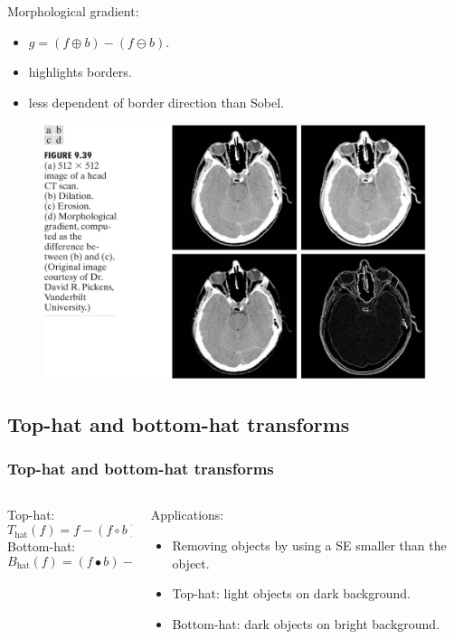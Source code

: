 \begin{frame}
Morphological gradient:
\begin{itemize}
\item $g = (f\oplus b) - (f \ominus b)$.
\item highlights borders.
\item less dependent of border direction than Sobel.
\end{itemize}
\begin{figure}[!h]
\includegraphics[width=.6\textwidth]{fig-9-39.png}
\end{figure}
\end{frame}

\subsection{Top-hat and bottom-hat transforms}

\begin{frame}
\frametitle{Top-hat and bottom-hat transforms}
\begin{columns}
\begin{column}{.5\textwidth}
Top-hat:
\[
T_{\text{hat}} (f) = f - (f \circ b)
\]
Bottom-hat:
\[
B_{\text{hat}} (f) = (f \bullet b) - f
\]
\end{column}
\begin{column}{.5\textwidth}
Applications:
\begin{itemize}
\item Removing objects by using a SE smaller than the object.
\item Top-hat: light objects on dark background.
\item Bottom-hat: dark objects on bright background.
\end{itemize}
\end{column}
\end{columns}
\end{frame}

